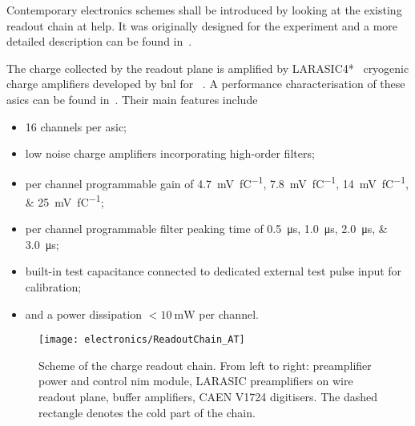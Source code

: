 Contemporary electronics schemes shall be introduced by looking at the existing readout chain at \gls{help}.
It was originally designed for the \AT{} experiment and a more detailed description can be found in~\cite{AT_larasic}.

The charge collected by the readout plane is amplified by LARASIC4*~\cite{larasic} cryogenic charge amplifiers developed by \gls{bnl} for \uboone{}~\cite{uboone}.
A performance characterisation of these \glspl{asic} can be found in~\cite{AT_larasic}.
Their main features include

\begin{itemize}
	\item \num{16} channels per \gls{asic};
	\item low noise charge amplifiers incorporating high-order filters;
	\item per channel programmable gain of \SIlist[list-final-separator = { or }]{4.7; 7.8; 14; 25}{\milli\volt\per\femto\coulomb};
	\item per channel programmable filter peaking time of \SIlist[list-final-separator = { or }]{0.5; 1.0; 2.0; 3.0}{\micro\second};
	\item built-in test capacitance connected to dedicated external test pulse input for calibration;
	\item and a power dissipation $< \SI{10}{\milli\watt}$ per channel.
\end{itemize}

\begin{figure}[htb]
	\centering
	\texttt{[image: electronics/ReadoutChain\_AT]}
	\caption[\AT{} charge readout chain]{%
		Scheme of the \AT{} charge readout chain.
		From left to right: preamplifier power and control \acrshort{nim} module, LARASIC preamplifiers on wire readout plane, buffer amplifiers, CAEN V1724 digitisers.
		The dashed rectangle denotes the cold part of the chain.~\cite{AT_larasic}
	}
	\label{fig:viper_readoutChain_AT}
\end{figure}

